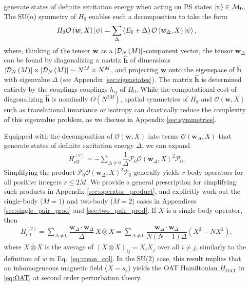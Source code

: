 \documentclass[nofootinbib,notitlepage,11pt]{revtex4-2}
\renewcommand{\t}{\text} %
\newcommand{\f}[2]{\dfrac{#1}{#2}} %
\newcommand{\p}[1]{\left(#1\right)} %
\renewcommand{\c}{\cdot} %
\newcommand{\m}{\bm} %
\newcommand{\1}{\mathds{1}}
\newcommand{\z}{\text{z}}
\newcommand{\D}{\mathcal{D}}
\newcommand{\M}{\mathcal{M}}
\renewcommand{\O}{\mathcal{O}}
\renewcommand{\P}{\mathcal{P}}
\newcommand{\col}{\underline}
\newcommand{\mean}{\overline}
\begin{document}
generate states of definite excitation energy when acting on PS states
$\ket\psi\in\M_0$.  The SU($n$) symmetry of $H_0$ enables such a
decomposition to take the form
\begin{align}
  H_0 \O\p{\m w,X} \ket\psi
  = \sum_\Delta \p{E_0+\Delta} \O\p{\m w_\Delta,X} \ket\psi,
\end{align}
where, thinking of the tensor $\m w$ as a $\abs{\D_N\p{M}}$-component
vector, the tensor $\m w_\Delta$ can be found by diagonalizing a
matrix $\hat{\m h}$ of dimensions
$\abs{\D_N\p{M}}\times\abs{\D_N\p{M}}\sim N^M\times N^M$, and
projecting $\m w$ onto the eigenspace of $\hat{\m h}$ with eigenvalue
$\Delta$ (see Appendix \ref{sec:eigenstates}).  The matrix
$\hat{\m h}$ is determined entirely by the couplings couplings
$h_{ij}$ of $H_0$.  While the computational cost of diagonalizing
$\hat{\m h}$ is nominally $O\p{N^{3M}}$, spatial symmetries of $H_0$
and $\O\p{\m w,X}$ such as translational invariance or isotropy can
drastically reduce the complexity of this eigenvalue problem, as we
discuss in Appendix \ref{sec:symmetries}.

Equipped with the decomposition of $\O\p{\m w,X}$ into terms
$\O\p{\m w_\Delta,X}$ that generate states of definite excitation
energy $\Delta$, we can expand
\begin{align}
  H_{\t{eff}}^{(2)} = -\sum_{\Delta\ne0} \f1\Delta
  \P_0 \O\p{\m w_\Delta,X}^2 \P_0.
\end{align}
Simplifying the product $\P_0 \O\p{\m w_\Delta,X}^2 \P_0$ generally
yields $r$-body operators for all positive integers $r\le2M$.  We
provide a general prescription for simplifying such products in
Appendix \ref{sec:operator_product}, and explicitly work out the
single-body ($M=1$) and two-body ($M=2$) cases in Appendices
\ref{sec:single_pair_prod} and \ref{sec:two_pair_prod}.  If $X$ is a
single-body operator, then
\begin{align}
  H_{\t{eff}}^{(2)}
  = \sum_{\Delta\ne0} \f{\m w_\Delta\c\m w_\Delta}{\Delta} \,
  \mean{X\otimes X}
  = \sum_{\Delta\ne0} \f{\m w_\Delta\c\m w_\Delta}{N\p{N-1}\Delta}
  \p{\col{X}^2 - N \col{X^2}},
  \label{eq:H_eff_2_1}
\end{align}
where $\mean{X\otimes X}$ is the average of
$\p{X\otimes X}_{ij}=X_iX_j$ over all $i\ne j$, similarly to the
definition of $\mean{w}$ in Eq.~\eqref{eq:mean_col}.  In the SU(2)
case, this result implies that an inhomogeneous magnetic field
($X=s_\z$) yields the OAT Hamiltonian $H_{\t{OAT}}$ in \eqref{eq:OAT}
at second order perturbation theory.
\end{document}
